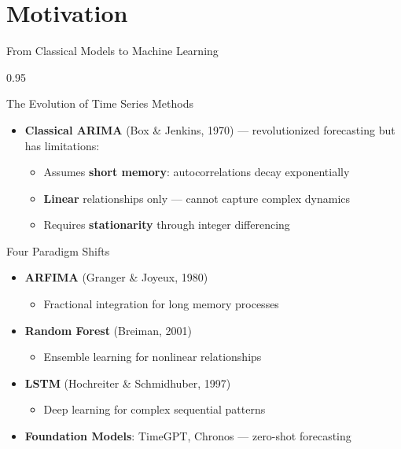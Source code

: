 \documentclass[9pt, aspectratio=169, t]{beamer}
\begin{document}
\section{Motivation}

\begin{frame}{From Classical Models to Machine Learning}
    \begin{cminipage}{0.95\textwidth}
    \begin{block}{The Evolution of Time Series Methods}
        \begin{itemize}\setlength{\itemsep}{0pt}
            \item \textbf{Classical ARIMA} (Box \& Jenkins, 1970) --- revolutionized forecasting but has limitations:
            \begin{itemize}\setlength{\itemsep}{0pt}
                \item Assumes \textbf{short memory}: autocorrelations decay exponentially
                \item \textbf{Linear} relationships only --- cannot capture complex dynamics
                \item Requires \textbf{stationarity} through integer differencing
            \end{itemize}
        \end{itemize}
    \end{block}

    \vspace{0.1cm}

    \begin{alertblock}{Four Paradigm Shifts}
        \begin{itemize}\setlength{\itemsep}{0pt}
            \item \textbf{ARFIMA} (Granger \& Joyeux, 1980)
            \begin{itemize}\setlength{\itemsep}{0pt}
                \item Fractional integration for long memory processes
            \end{itemize}
            \item \textbf{Random Forest} (Breiman, 2001)
            \begin{itemize}\setlength{\itemsep}{0pt}
                \item Ensemble learning for nonlinear relationships
            \end{itemize}
            \item \textbf{LSTM} (Hochreiter \& Schmidhuber, 1997)
            \begin{itemize}\setlength{\itemsep}{0pt}
                \item Deep learning for complex sequential patterns
            \end{itemize}
            \item \textbf{Foundation Models}: TimeGPT, Chronos --- zero-shot forecasting
        \end{itemize}
    \end{alertblock}
    \end{cminipage}
\end{frame}
\end{document}

